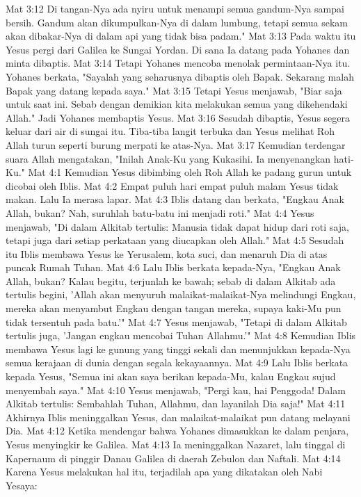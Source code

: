 Mat 3:12  Di tangan-Nya ada nyiru untuk menampi semua gandum-Nya sampai bersih. Gandum akan dikumpulkan-Nya di dalam lumbung, tetapi semua sekam akan dibakar-Nya di dalam api yang tidak bisa padam."
Mat 3:13  Pada waktu itu Yesus pergi dari Galilea ke Sungai Yordan. Di sana Ia datang pada Yohanes dan minta dibaptis.
Mat 3:14  Tetapi Yohanes mencoba menolak permintaan-Nya itu. Yohanes berkata, "Sayalah yang seharusnya dibaptis oleh Bapak. Sekarang malah Bapak yang datang kepada saya."
Mat 3:15  Tetapi Yesus menjawab, "Biar saja untuk saat ini. Sebab dengan demikian kita melakukan semua yang dikehendaki Allah." Jadi Yohanes membaptis Yesus.
Mat 3:16  Sesudah dibaptis, Yesus segera keluar dari air di sungai itu. Tiba-tiba langit terbuka dan Yesus melihat Roh Allah turun seperti burung merpati ke atas-Nya.
Mat 3:17  Kemudian terdengar suara Allah mengatakan, "Inilah Anak-Ku yang Kukasihi. Ia menyenangkan hati-Ku."
Mat 4:1  Kemudian Yesus dibimbing oleh Roh Allah ke padang gurun untuk dicobai oleh Iblis.
Mat 4:2  Empat puluh hari empat puluh malam Yesus tidak makan. Lalu Ia merasa lapar.
Mat 4:3  Iblis datang dan berkata, "Engkau Anak Allah, bukan? Nah, suruhlah batu-batu ini menjadi roti."
Mat 4:4  Yesus menjawab, "Di dalam Alkitab tertulis: Manusia tidak dapat hidup dari roti saja, tetapi juga dari setiap perkataan yang diucapkan oleh Allah."
Mat 4:5  Sesudah itu Iblis membawa Yesus ke Yerusalem, kota suci, dan menaruh Dia di atas puncak Rumah Tuhan.
Mat 4:6  Lalu Iblis berkata kepada-Nya, "Engkau Anak Allah, bukan? Kalau begitu, terjunlah ke bawah; sebab di dalam Alkitab ada tertulis begini, 'Allah akan menyuruh malaikat-malaikat-Nya melindungi Engkau, mereka akan menyambut Engkau dengan tangan mereka, supaya kaki-Mu pun tidak tersentuh pada batu.'"
Mat 4:7  Yesus menjawab, "Tetapi di dalam Alkitab tertulis juga, 'Jangan engkau mencobai Tuhan Allahmu.'"
Mat 4:8  Kemudian Iblis membawa Yesus lagi ke gunung yang tinggi sekali dan menunjukkan kepada-Nya semua kerajaan di dunia dengan segala kekayaannya.
Mat 4:9  Lalu Iblis berkata kepada Yesus, "Semua ini akan saya berikan kepada-Mu, kalau Engkau sujud menyembah saya."
Mat 4:10  Yesus menjawab, "Pergi kau, hai Penggoda! Dalam Alkitab tertulis: Sembahlah Tuhan, Allahmu, dan layanilah Dia saja!"
Mat 4:11  Akhirnya Iblis meninggalkan Yesus, dan malaikat-malaikat pun datang melayani Dia.
Mat 4:12  Ketika mendengar bahwa Yohanes dimasukkan ke dalam penjara, Yesus menyingkir ke Galilea.
Mat 4:13  Ia meninggalkan Nazaret, lalu tinggal di Kapernaum di pinggir Danau Galilea di daerah Zebulon dan Naftali.
Mat 4:14  Karena Yesus melakukan hal itu, terjadilah apa yang dikatakan oleh Nabi Yesaya:
